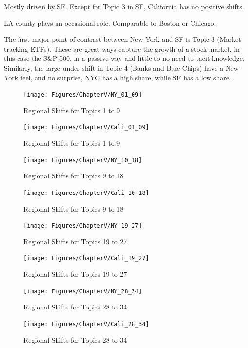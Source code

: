 Mostly driven by SF. Except for Topic 3 in SF, California has no positive shifts.   





LA county plays an occasional role.  Comparable to Boston or Chicago.  

The first major point of contrast between New York and SF is Topic 3 (Market tracking ETFs).  These are great ways capture the growth of a stock market, in this case the S\&P 500, in a passive way and little to no need to tacit knowledge.  Similarly, the large under shift in Topic 4 (Banks and Blue Chips) have a New York feel, and no surprise, NYC has a high share, while SF has a low share.  


	
\begin{figure}
	\centering
	\texttt{[image: Figures/ChapterV/NY\_01\_09]}
	\caption[Regional Shifts for Topics 1 to 9]{Regional Shifts for Topics 1 to 9}
	\label{fig:NYC0109}
\end{figure}

\begin{figure}
	\centering
	\texttt{[image: Figures/ChapterV/Cali\_01\_09]}
	\caption[Regional Shifts for Topics 1 to 9]{Regional Shifts for Topics 1 to 9}
	\label{fig:SF0109}
\end{figure}
	


\begin{figure}
	\centering
	\texttt{[image: Figures/ChapterV/NY\_10\_18]}
	\caption[Regional Shifts for Topics 9 to 18]{Regional Shifts for Topics 9 to 18}
	\label{fig:NYC10-18}
\end{figure}

\begin{figure}
	\centering
	\texttt{[image: Figures/ChapterV/Cali\_10\_18]}
	\caption[Regional Shifts for Topics 9 to 18]{Regional Shifts for Topics 9 to 18}
	\label{fig:CA10-18}
\end{figure}

\begin{figure}
	\centering
	\texttt{[image: Figures/ChapterV/NY\_19\_27]}
	\caption[Regional Shifts for Topics 19 to 27]{Regional Shifts for Topics 19 to 27}
	\label{fig:NYC19-27}
\end{figure}

\begin{figure}
	\centering
	\texttt{[image: Figures/ChapterV/Cali\_19\_27]}
	\caption[Regional Shifts for Topics 19 to 27]{Regional Shifts for Topics 19 to 27}
	\label{fig:CA19-27}
\end{figure}


\begin{figure}
	\centering
	\texttt{[image: Figures/ChapterV/NY\_28\_34]}
	\caption[Regional Shifts for Topics 19 to 27]{Regional Shifts for Topics 28 to 34}
	\label{fig:NYC28-34}
\end{figure}


\begin{figure}
	\centering
	\texttt{[image: Figures/ChapterV/Cali\_28\_34]}
	\caption[Regional Shifts for Topics 19 to 27]{Regional Shifts for Topics 28 to 34}
	\label{fig:CA28-34}
\end{figure}


